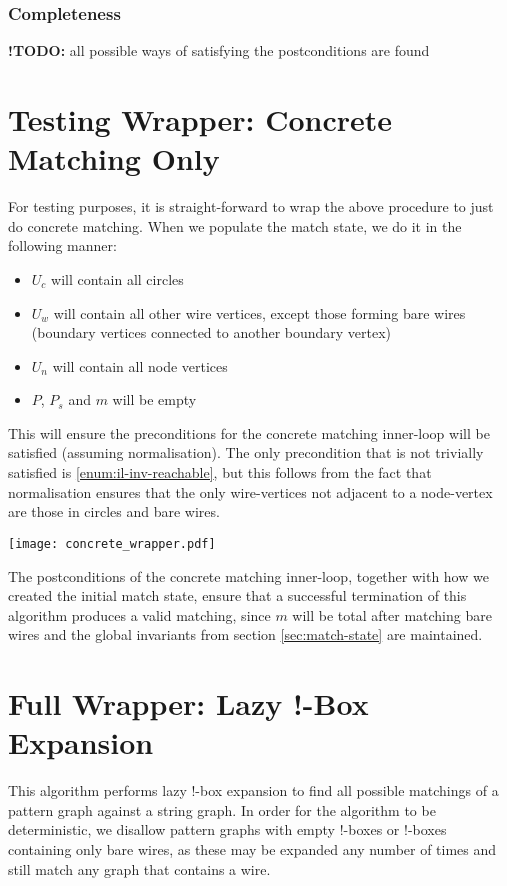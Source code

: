 \documentclass{article}
\newcommand{\TODOinline}[1]{%
\typeout{WARNING!!! there is still a TODO left}
{\color{blue}\textbf{!TODO: }#1}
}
\begin{document}
\subsubsection{Completeness}

\TODOinline{all possible ways of satisfying the postconditions are found}
\section{Testing Wrapper: Concrete Matching Only}
\label{sec:test-wrapper}

For testing purposes, it is straight-forward to wrap the above procedure to just do concrete matching.  When we populate the match state, we do it in the following manner:
\begin{itemize}
\item $U_c$ will contain all circles
\item $U_w$ will contain all other wire vertices, except those forming bare wires (boundary vertices connected to another boundary vertex)
\item $U_n$ will contain all node vertices
\item $P$, $P_s$ and $m$ will be empty
\end{itemize}

This will ensure the preconditions for the concrete matching inner-loop will be satisfied (assuming normalisation).  The only precondition that is not trivially satisfied is \ref{enum:il-inv-reachable}, but this follows from the fact that normalisation ensures that the only wire-vertices not adjacent to a node-vertex are those in circles and bare wires.

\begin{center}
  \texttt{[image: concrete\_wrapper.pdf]}
\end{center}

The postconditions of the concrete matching inner-loop, together with how we created the initial match state, ensure that a successful termination of this algorithm produces a valid matching, since $m$ will be total after matching bare wires and the global invariants from section \ref{sec:match-state} are maintained.

\section{Full Wrapper: Lazy !-Box Expansion}
\label{sec:full-wrapper}

This algorithm performs lazy $!$-box expansion to find all possible matchings of a pattern graph against a string graph.  In order for the algorithm to be deterministic, we disallow pattern graphs with empty $!$-boxes or $!$-boxes containing only bare wires, as these may be expanded any number of times and still match any graph that contains a wire.
\end{document}
